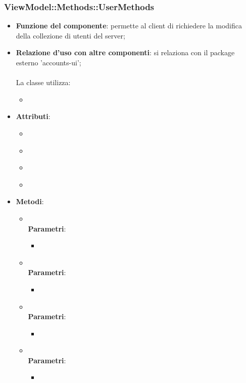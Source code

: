 \subsubsection{ViewModel::Methods::UserMethods}
\begin{itemize}
\item\textbf{Funzione del componente}: permette al client di richiedere la modifica della collezione di utenti del server;
	\item\textbf{Relazione d'uso con altre componenti}:  si relaziona con il package esterno 'accounts-ui';\\ \\
La classe utilizza:
	\begin{itemize}
		\item
	\end{itemize}
\item\textbf{Attributi}:
	\begin{itemize}
		\item\code{}\\
		\item\code{}\\
		\item\code{}\\
		\item\code{}\\
	\end{itemize}
\item\textbf{Metodi}:
	\begin{itemize}
		\item\code{}\\
		\textbf{Parametri}:
			\begin{itemize}
				\item\code{}\\
			\end{itemize}
		\item\code{}\\
		\textbf{Parametri}:
			\begin{itemize}
				\item\code{}\\
			\end{itemize}
		\item\code{}\\
		\textbf{Parametri}:
			\begin{itemize}
				\item\code{}\\
			\end{itemize}
		\item\code{}\\
		\textbf{Parametri}:
			\begin{itemize}
				\item\code{}\\
			\end{itemize}
	\end{itemize}
\end{itemize}

